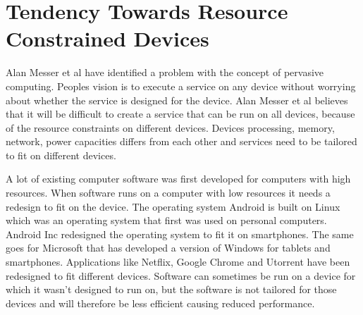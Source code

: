\section{Tendency Towards Resource Constrained Devices}
Alan Messer et al \cite{alanmesser} have identified a problem with the concept of pervasive computing. Peoples vision is to execute a service on any device without worrying about whether the service is designed for the device. Alan Messer et al believes that it will be difficult to create a service that can be run on all devices, because of the resource constraints on different devices. Devices processing, memory, network, power capacities differs from each other and services need to be tailored to fit on different devices. 

A lot of existing computer software was first developed for computers with high resources. When software runs on a computer with low resources it needs a redesign to fit on the device. The operating system Android is built on Linux which was an operating system that first was used on personal computers. Android Inc redesigned the operating system to fit it on smartphones. The same goes for Microsoft that has developed a version of Windows for tablets and smartphones. Applications like Netflix, Google Chrome and Utorrent have been redesigned to fit different devices. Software can sometimes be run on a device for which it wasn't designed to run on, but the software is not tailored for those devices and will therefore be less efficient causing reduced performance.
